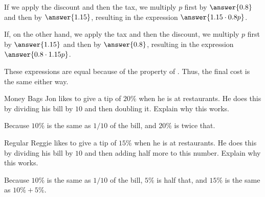 \documentclass[nooutcomes]{ximera}
\begin{document}
\begin{problem}
\begin{problem}
\begin{problem}
\begin{problem}
If we apply the discount and then the tax, we multiply $p$ first by $\answer{0.8}$ and then by $\answer{1.15}$, resulting in the expression $\answer{1.15\cdot 0.8p}$. 

If, on the other hand, we apply the tax and then the discount, we multiply $p$ first by $\answer{1.15}$ and then by $\answer{0.8}$, resulting in the expression $\answer{0.8\cdot 1.15p}$. 

These expressions are equal because of the  property of .  Thus, the final cost is the same either way. 
\end{problem}
\end{problem} 
\end{problem}
\end{problem}


\begin{problem}Money Bags Jon likes to give a tip of $20$\% when he is at
  restaurants. He does this by dividing his bill by $10$ and then
  doubling it. Explain why this works.
\begin{freeResponse}
\begin{hint}
Because $10\%$ is the same as $1/10$ of the bill, and $20\%$ is twice that.  
\end{hint}
\end{freeResponse}
\end{problem} 

\begin{problem}Regular Reggie likes to give a tip of $15$\% when he is at
  restaurants. He does this by dividing his bill by $10$ and then
  adding half more to this number. Explain why this works.
\begin{freeResponse}
\begin{hint}
Because $10\%$ is the same as $1/10$ of the bill, $5\%$ is half that, and $15\%$ is the same as $10\% + 5\%$.  
\end{hint}
\end{freeResponse}
\end{problem} 
\end{document}
